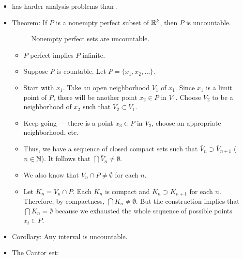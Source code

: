 \documentclass[../../notes.tex]{subfiles}
\begin{document}
\begin{itemize}
\begin{itemize}
\begin{itemize}
        \end{itemize}
    \end{itemize}
    \item {}\textcite{bib:HewittStromberg} has harder analysis problems than \textcite{bib:Rudin}.
    \item Theorem: If $P$ is a nonempty perfect subset of $\mathbb{R}^k$, then $P$ is uncountable.
    \begin{figure}[h!]
        \centering
        \caption{Nonempty perfect sets are uncountable.}
        \label{fig:perfUnc}
    \end{figure}
    \begin{itemize}
        \item $P$ perfect implies $P$ infinite.
        \item Suppose $P$ is countable. Let $P=\{x_1,x_2,\dots\}$.
        \item Start with $x_1$. Take an open neighborhood $V_1$ of $x_1$. Since $x_1$ is a limit point of $P$, there will be another point $x_2\in P$ in $V_1$. Choose $V_2$ to be a neighborhood of $x_2$ such that $\bar{V_2}\subset V_1$.
        \item Keep going --- there is a point $x_3\in P$ in $V_2$, choose an appropriate neighborhood, etc.
        \item Thus, we have a sequence of closed compact sets such that $\bar{V}_n\supset\bar{V}_{n+1}$ ($n\in\mathbb{N}$). It follows that $\bigcap\bar{V}_n\neq\emptyset$.
        \item We also know that $V_n\cap P\neq\emptyset$ for each $n$.
        \item Let $K_n=\bar{V}_n\cap P$. Each $K_n$ is compact and $K_n\supset K_{n+1}$ for each $n$. Therefore, by compactness, $\bigcap K_n\neq\emptyset$. But the construction implies that $\bigcap K_n=\emptyset$ because we exhausted the whole sequence of possible points $x_i\in P$.
    \end{itemize}
    \item Corollary: Any interval is uncountable.
    \item The Cantor set:
    \begin{figure}[h!]
        \centering
\end{figure}
\end{itemize}
\end{document}
